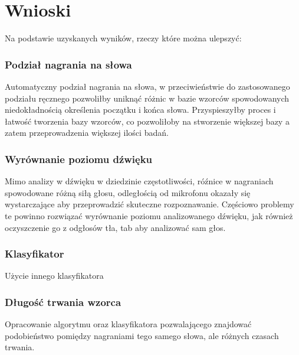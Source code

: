 \section{Wnioski}

Na podstawie uzyskanych wyników, 
rzeczy które można ulepszyć:

\subsubsection{Podział nagrania na słowa}
Automatyczny podział nagrania na słowa, w przeciwieństwie do zastosowanego podziału ręcznego pozwoliłby uniknąć różnic w bazie wzorców spowodowanych niedokładnością określenia początku i końca słowa. Przyspieszyłby proces i łatwość tworzenia bazy wzorców, co pozwoliłoby na stworzenie większej bazy a zatem przeprowadzenia większej ilości badań.

\subsubsection{Wyrównanie poziomu dźwięku}
Mimo analizy w dźwięku w dziedzinie częstotliwości, róźnice w nagraniach spowodowane różną siłą głosu, odległością od mikrofonu okazały się wystarczające aby przeprowadzić skuteczne rozpoznawanie. Częściowo problemy te powinno rozwiązać wyrównanie poziomu analizowanego dźwięku, jak również oczyszczenie go z odgłosów tła, tab aby analizować sam głos.

\subsubsection{Klasyfikator}
Użycie innego klasyfikatora

\subsubsection{Długość trwania wzorca}
Opracowanie algorytmu oraz klasyfikatora pozwalającego znajdować podobieństwo pomiędzy nagraniami tego samego słowa, ale różnych czasach trwania. 